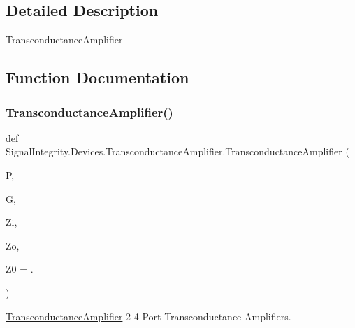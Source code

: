 \subsection{Detailed Description}
\begin{DoxyVerb}TransconductanceAmplifier\end{DoxyVerb}
 

\subsection{Function Documentation}
\mbox{\label{namespaceSignalIntegrity_1_1Devices_1_1TransconductanceAmplifier_a4f22a921c3981307d49cc88fc2444380}} 
\subsubsection{\texorpdfstring{Transconductance\+Amplifier()}{TransconductanceAmplifier()}}
{\footnotesize\ttfamily def Signal\+Integrity.\+Devices.\+Transconductance\+Amplifier.\+Transconductance\+Amplifier (\begin{DoxyParamCaption}\item[{}]{P,  }\item[{}]{G,  }\item[{}]{Zi,  }\item[{}]{Zo,  }\item[{}]{Z0 = {.} }\end{DoxyParamCaption})}



\hyperlink{namespaceSignalIntegrity_1_1Devices_1_1TransconductanceAmplifier}{Transconductance\+Amplifier} 2-\/4 Port Transconductance Amplifiers. 


